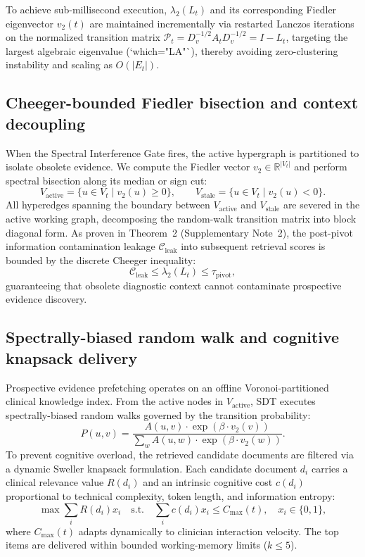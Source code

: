 \documentclass[12pt]{article}
\newcommand{\R}{\mathbb{R}}
\begin{document}
To achieve sub-millisecond execution, $\lambda_2(L_t)$ and its corresponding Fiedler eigenvector $v_2(t)$ are maintained incrementally via restarted Lanczos iterations on the normalized transition matrix $\mathcal{P}_t = D_v^{-1/2} A_t D_v^{-1/2} = I - L_t$, targeting the largest algebraic eigenvalue (`which="LA"`), thereby avoiding zero-clustering instability and scaling as $O(|E_t|)$.

\subsection*{Cheeger-bounded Fiedler bisection and context decoupling}

When the Spectral Interference Gate fires, the active hypergraph is partitioned to isolate obsolete evidence. We compute the Fiedler vector $v_2 \in \R^{|V_t|}$ and perform spectral bisection along its median or sign cut:
\begin{equation}
  V_{\text{active}} = \{u \in V_t \mid v_2(u) \ge 0\}, \qquad V_{\text{stale}} = \{u \in V_t \mid v_2(u) < 0\}.
\end{equation}
All hyperedges spanning the boundary between $V_{\text{active}}$ and $V_{\text{stale}}$ are severed in the active working graph, decomposing the random-walk transition matrix into block diagonal form. As proven in Theorem~2 (Supplementary Note~2), the post-pivot information contamination leakage $\mathcal{C}_{\text{leak}}$ into subsequent retrieval scores is bounded by the discrete Cheeger inequality:
\begin{equation}
  \mathcal{C}_{\text{leak}} \le \lambda_2(L_t) \le \tau_{\text{pivot}},
\end{equation}
guaranteeing that obsolete diagnostic context cannot contaminate prospective evidence discovery.

\subsection*{Spectrally-biased random walk and cognitive knapsack delivery}

Prospective evidence prefetching operates on an offline Voronoi-partitioned clinical knowledge index. From the active nodes in $V_{\text{active}}$, SDT executes spectrally-biased random walks governed by the transition probability:
\begin{equation}
  P(u, v) = \frac{A(u, v) \cdot \exp(\beta \cdot v_2(v))}{\sum_{w} A(u, w) \cdot \exp(\beta \cdot v_2(w))}.
\end{equation}
To prevent cognitive overload, the retrieved candidate documents are filtered via a dynamic Sweller knapsack formulation\cite{sweller1988cognitive,sweller2019cognitive}. Each candidate document $d_i$ carries a clinical relevance value $R(d_i)$ and an intrinsic cognitive cost $c(d_i)$ proportional to technical complexity, token length, and information entropy:
\begin{equation}
  \max \sum_{i} R(d_i) x_i \quad \text{s.t.} \quad \sum_{i} c(d_i) x_i \le C_{\max}(t), \quad x_i \in \{0, 1\},
\end{equation}
where $C_{\max}(t)$ adapts dynamically to clinician interaction velocity. The top items are delivered within bounded working-memory limits ($k \le 5$).
\end{document}
